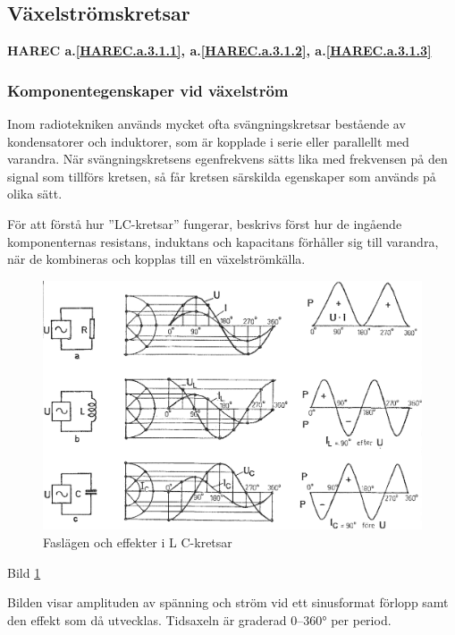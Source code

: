 \subsection{Växelströmskretsar}
\textbf{HAREC a.\ref{HAREC.a.3.1.1}\label{myHAREC.a.3.1.1h}, a.\ref{HAREC.a.3.1.2}\label{myHAREC.a.3.1.2b}, a.\ref{HAREC.a.3.1.3}\label{myHAREC.a.3.1.3b}}

\subsubsection{Komponentegenskaper vid växelström}

Inom radiotekniken används mycket ofta svängningskretsar bestående av
kondensatorer och induktorer, som är kopplade i serie eller parallellt med
varandra. När svängningskretsens egenfrekvens sätts lika med frekvensen på den
signal som tillförs kretsen, så får kretsen särskilda egenskaper som används på
olika sätt.

För att förstå hur ''LC-kretsar'' fungerar, beskrivs först hur de ingående
komponenternas resistans, induktans och kapacitans förhåller sig till varandra,
när de kombineras och kopplas till en växelströmkälla.

\begin{figure}
\includegraphics[width=\textwidth]{images/cropped_pdfs/bild_2_3-11.pdf}
\caption{Faslägen och effekter i L C-kretsar}
\label{fig:BildII3-11}
\end{figure}

Bild \ref{fig:BildII3-11}

Bilden visar amplituden av spänning och ström vid ett sinusformat förlopp samt
den effekt som då utvecklas. Tidsaxeln är graderad 0--360° per period.

